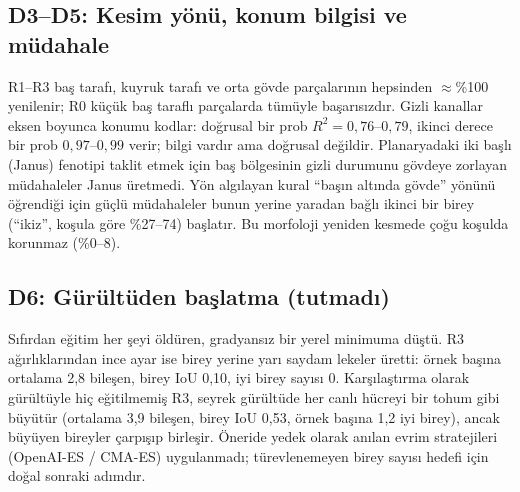 \documentclass[conference]{IEEEtran}
\begin{document}
\subsection{D3--D5: Kesim yönü, konum bilgisi ve müdahale}
R1--R3 baş tarafı, kuyruk tarafı ve orta gövde parçalarının hepsinden $\approx$\%100 yenilenir; R0 küçük baş taraflı parçalarda tümüyle başarısızdır. Gizli kanallar eksen boyunca konumu kodlar: doğrusal bir prob $R^2 = 0{,}76$--$0{,}79$, ikinci derece bir prob $0{,}97$--$0{,}99$ verir; bilgi vardır ama doğrusal değildir. Planaryadaki iki başlı (Janus) fenotipi taklit etmek için baş bölgesinin gizli durumunu gövdeye zorlayan müdahaleler Janus üretmedi. Yön algılayan kural ``başın altında gövde'' yönünü öğrendiği için güçlü müdahaleler bunun yerine yaradan bağlı ikinci bir birey (``ikiz'', koşula göre \%27--74) başlatır. Bu morfoloji yeniden kesmede çoğu koşulda korunmaz (\%0--8).

\subsection{D6: Gürültüden başlatma (tutmadı)}
Sıfırdan eğitim her şeyi öldüren, gradyansız bir yerel minimuma düştü. R3 ağırlıklarından ince ayar ise birey yerine yarı saydam lekeler üretti: örnek başına ortalama 2,8 bileşen, birey IoU 0,10, iyi birey sayısı 0. Karşılaştırma olarak gürültüyle hiç eğitilmemiş R3, seyrek gürültüde her canlı hücreyi bir tohum gibi büyütür (ortalama 3,9 bileşen, birey IoU 0,53, örnek başına 1,2 iyi birey), ancak büyüyen bireyler çarpışıp birleşir. Öneride yedek olarak anılan evrim stratejileri (OpenAI-ES / CMA-ES) uygulanmadı; türevlenemeyen birey sayısı hedefi için doğal sonraki adımdır.
\end{document}
